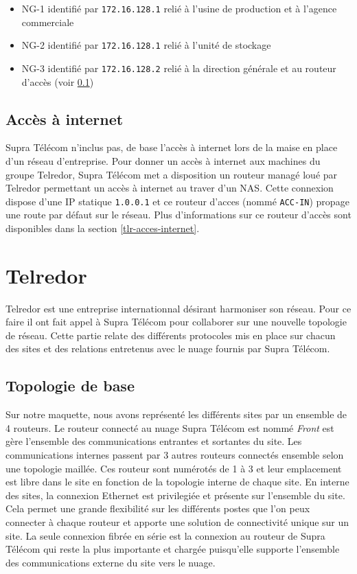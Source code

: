 \documentclass{article}
\newcommand{\tlr}{Telredor\xspace}
\newcommand{\spr}{Supra Télécom\xspace}
\begin{document}
\begin{itemize}
	\item NG-1 identifié par \texttt{172.16.128.1} relié à l'usine de production et à l'agence commerciale
	\item NG-2 identifié par \texttt{172.16.128.1} relié à l'unité de stockage
	\item NG-3 identifié par \texttt{172.16.128.2} relié à la direction générale et au routeur d'accès (voir \ref{acces-internet})
\end{itemize}

\bigskip

\subsection{Accès à internet}
\label{acces-internet}

\spr n'inclus pas, de base l'accès à internet lors de la maise en place d'un réseau d'entreprise.
Pour donner un accès à internet aux machines du groupe \tlr, \spr met a disposition un routeur managé loué par \tlr permettant un accès à internet au traver d'un NAS.
Cette connexion dispose d'une IP statique \texttt{1.0.0.1} et ce routeur d'acces (nommé \texttt{ACC-IN}) propage une route par défaut sur le réseau.
Plus d'informations sur ce routeur d'accès sont disponibles dans la section \ref{tlr-acces-internet}.

\section{\tlr}

\tlr est une entreprise internationnal désirant harmoniser son réseau.
Pour ce faire il ont fait appel à \spr pour collaborer sur une nouvelle topologie de réseau.
Cette partie relate des différents protocoles mis en place sur chacun des sites et des relations entretenus avec le nuage fournis par \spr.

\subsection{Topologie de base}

Sur notre maquette, nous avons représenté les différents sites par un ensemble de 4 routeurs.
Le routeur connecté au nuage \spr est nommé \emph{Front} est gère l'ensemble des communications entrantes et sortantes du site.
Les communications internes passent par 3 autres routeurs connectés ensemble selon une topologie maillée.
Ces routeur sont numérotés de 1 à 3 et leur emplacement est libre dans le site en fonction de la topologie interne de chaque site.
En interne des sites, la connexion Ethernet est privilegiée et présente sur l'ensemble du site.
Cela permet une grande flexibilité sur les différents postes que l'on peux connecter à chaque routeur et apporte une solution de connectivité unique sur un site.
La seule connexion fibrée en série est la connexion au routeur de \spr qui reste la plus importante et chargée puisqu'elle supporte l'ensemble des communications externe du site vers le nuage.
\end{document}
